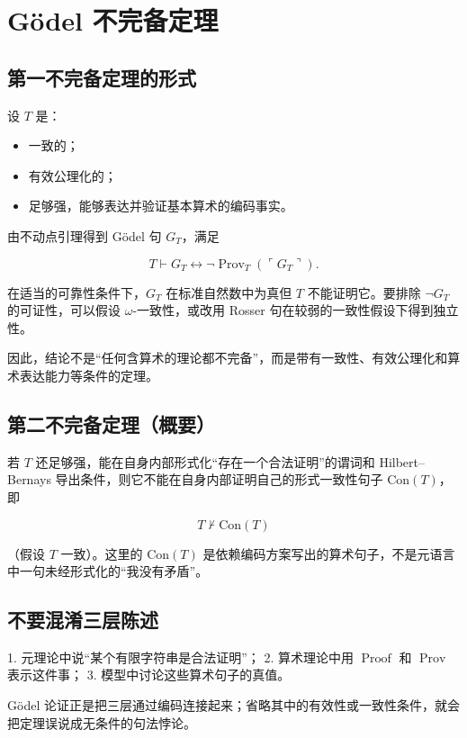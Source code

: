 \section{Gödel 不完备定理}


\subsection{第一不完备定理的形式}


设 $T$ 是：

\begin{itemize}
\item 一致的；
\item 有效公理化的；
\item 足够强，能够表达并验证基本算术的编码事实。
\end{itemize}


由不动点引理得到 Gödel 句 $G_T$，满足

\[
T\vdash G_T\leftrightarrow\neg\operatorname{Prov}_T(\ulcorner G_T\urcorner).
\]

在适当的可靠性条件下，$G_T$ 在标准自然数中为真但 $T$ 不能证明它。要排除 $\neg G_T$ 的可证性，可以假设 $\omega$-一致性，或改用 Rosser 句在较弱的一致性假设下得到独立性。

因此，结论不是“任何含算术的理论都不完备”，而是带有一致性、有效公理化和算术表达能力等条件的定理。

\subsection{第二不完备定理（概要）}


若 $T$ 还足够强，能在自身内部形式化“存在一个合法证明”的谓词和 Hilbert–Bernays 导出条件，则它不能在自身内部证明自己的形式一致性句子 $\mathrm{Con}(T)$，即

\[
T\nvdash\mathrm{Con}(T)
\]

（假设 $T$ 一致）。这里的 $\mathrm{Con}(T)$ 是依赖编码方案写出的算术句子，不是元语言中一句未经形式化的“我没有矛盾”。

\subsection{不要混淆三层陈述}


1. 元理论中说“某个有限字符串是合法证明”；
2. 算术理论中用 $\operatorname{Proof}$ 和 $\operatorname{Prov}$ 表示这件事；
3. 模型中讨论这些算术句子的真值。

Gödel 论证正是把三层通过编码连接起来；省略其中的有效性或一致性条件，就会把定理误说成无条件的句法悖论。
